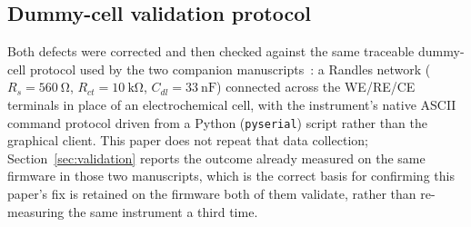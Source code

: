 \subsection{Dummy-cell validation protocol}
\label{sec:protocol}
Both defects were corrected and then checked against the same traceable
dummy-cell protocol used by the two companion
manuscripts~\cite{clement2026linearity,clement2026architecture}: a Randles
network ($R_s=\SI{560}{\ohm}$, $R_{ct}=\SI{10}{\kilo\ohm}$,
$C_{dl}=\SI{33}{\nano\farad}$) connected across the WE/RE/CE terminals in
place of an electrochemical cell, with the instrument's native ASCII
command protocol driven from a Python (\texttt{pyserial}) script rather
than the graphical client. This paper does not repeat that data collection;
Section~\ref{sec:validation} reports the outcome already measured on the
same firmware in those two manuscripts, which is the correct basis for
confirming this paper's fix is retained on the firmware both of them
validate, rather than re-measuring the same instrument a third time.
